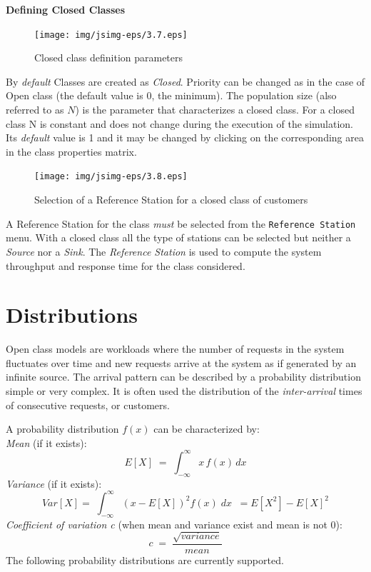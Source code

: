 \textbf{Defining Closed Classes}
\begin{figure}[htb]
    \begin{center}
        \texttt{[image: img/jsimg-eps/3.7.eps]}
    \end{center}
    \caption{Closed class definition parameters}
    \label{fig:closecldef}
\end{figure}


By \emph{default} Classes are created as \emph{Closed}. Priority
can be changed as in the case of Open class (the default value is
0, the minimum). The population size (also referred to as $N$) is
the parameter that characterizes a closed class.  For a closed
class N is constant and does not change during the execution of
the simulation. Its \emph{default} value is 1 and it may be
changed by clicking on the corresponding area in the class
properties matrix.
\begin{figure}[htb]
    \begin{center}
        \texttt{[image: img/jsimg-eps/3.8.eps]}
    \end{center}
    \caption{Selection of a Reference Station for a closed class of customers}
    \label{fig:closerefstat}
\end{figure}
A Reference Station for the class \emph{must} be selected from the
\texttt{Reference Station} menu. With a closed class all the type
of stations can be selected but neither a \emph{Source} nor a
\emph{Sink}. The \emph{Reference Station} is used to compute the
system throughput and response time for the class considered.

\section{Distributions}
\label{distns}
Open class models are workloads where the number of
requests in the system fluctuates over time and new  requests
arrive at the system as if generated by an infinite source. The
arrival pattern can be described by a probability distribution
simple or very complex. It is often used the distribution of the
\emph{inter-arrival} times of consecutive requests, or customers.

A probability distribution $f(x)$ can be characterized by:\\
\emph{Mean} (if it exists):
\[
E[X]\; =\;\int_{-\infty}^{\infty} x\, f(x)\,dx
\]
\emph{Variance} (if it exists):
\[
Var[X] = \; \int_{-\infty}^{\infty} (x-E[X])^2 f(x)\; dx \;\; =
E[X^2] - E[X]^2
\]
\emph{Coefficient of variation c} (when mean and variance exist
and mean is not 0):
\[
c\; = \; \frac{\sqrt{variance}}{mean}
\]
The following probability distributions are currently supported.\\

